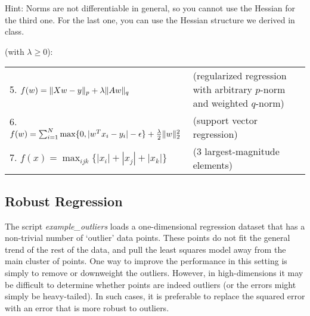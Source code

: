 \documentclass{article}
\begin{document}
Hint: Norms are not differentiable in general, so you cannot use the Hessian for the third one. For the last one, you can use the Hessian structure we derived in class.

 (with $\lambda \geq 0$):
\begin{center}
\begin{tabular}{lll}
5. $f(w) = \|Xw - y\|_p + \lambda\|Aw\|_q$ & (regularized regression with arbitrary $p$-norm and weighted $q$-norm)\\
6. $f(w) = \sum_{i=1}^N\max\{0, |w^Tx_i - y_i| - \epsilon\} + \frac{\lambda}{2}\|w\|_2^2$ & (support vector regression)\\
7. $f(x) = \max_{ijk}\{|x_i| + |x_j| + |x_k|\}$ & ($3$ largest-magnitude elements) 
\end{tabular}
\end{center}






\subsection{Robust Regression}

The script \emph{example\_outliers} loads a one-dimensional regression dataset that has a non-trivial number of `outlier' data points. These points do not fit the general trend of the rest of the data, and pull the least squares model away from the main cluster of points. One way to improve the performance in this setting is simply to remove or downweight the outliers. However, in high-dimensions it may be difficult to determine whether points are indeed outliers (or the errors might simply be heavy-tailed). In such cases, it is preferable to replace the squared error with an error that is more robust to outliers. 
\end{document}
